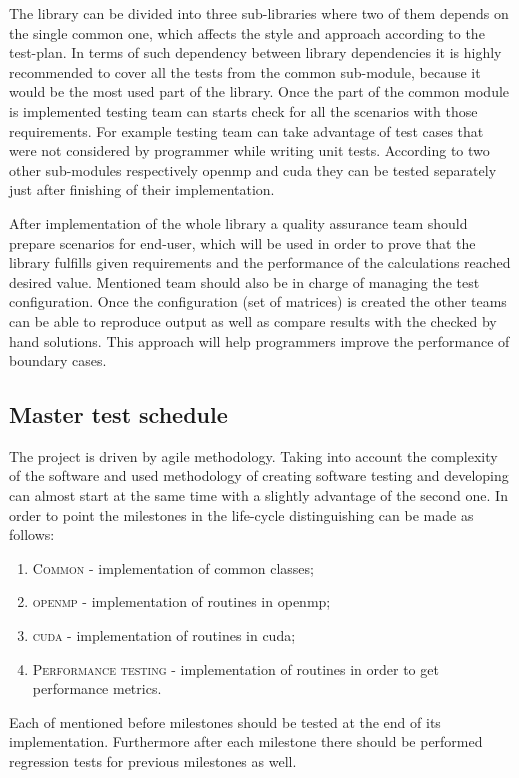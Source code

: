 	The library can be divided into three sub-libraries where two of them depends on the single common one, which affects the style and approach according to the test-plan. In terms of such dependency between library dependencies it is highly recommended to cover all the tests from the common sub-module, because it would be the most used part of the library. Once the part of the common module is implemented testing team can starts check for all the scenarios with those requirements. For example testing team can take advantage of test cases that were not considered by programmer while writing unit tests. According to two other sub-modules respectively \gls{openmp} and \gls{cuda} they can be tested separately just after finishing of their implementation.
	
	After implementation of the whole library a quality assurance team should prepare scenarios for end-user, which will be used in order to prove that the library fulfills given requirements and the performance of the calculations reached desired value. Mentioned team should also be in charge of managing the test configuration. Once the configuration (set of matrices) is created the other teams can be able to reproduce output as well as compare results with the checked by hand solutions. This approach will help programmers improve the performance of boundary cases. 
\subsection{Master test schedule} \label{s:introduction:master-test-schedule}
	\begin{comment}
		$<$Describe the test activities within the project life cycle and milestones. Summarize the overall schedule of the testing tasks, identifying where task results feed back to the development, organizational, and supporting processes (e.g., quality assurance and configuration management). Describe the task iteration policy for the re-execution of test tasks and any dependencies. $>$
	\end{comment}
	The project is driven by agile methodology. Taking into account the complexity of the software and used methodology of creating software testing and developing can almost start at the same time with a slightly advantage of the second one. In order to point the milestones in the life-cycle distinguishing can be made as follows:
	\begin{enumerate}
		\item \textsc{Common} - implementation of common classes;
		\item \textsc{\gls{openmp}} - implementation of routines in \gls{openmp};
		\item \textsc{\gls{cuda}} - implementation of routines in \gls{cuda};
		\item \textsc{Performance testing} - implementation of routines in order to get performance metrics.
	\end{enumerate}
	Each of mentioned before milestones should be tested at the end of its implementation. Furthermore after each milestone there should be performed regression tests for previous milestones as well. 
